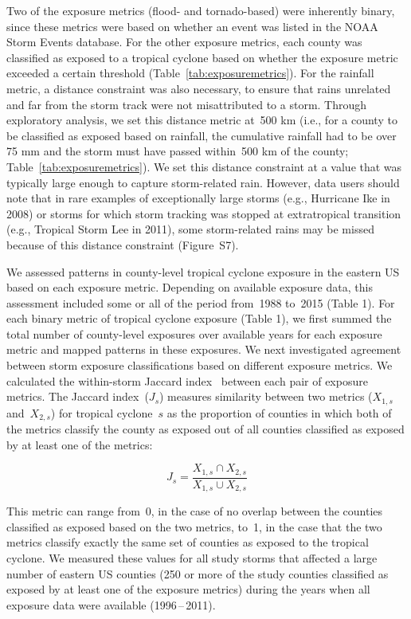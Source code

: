 Two of the exposure metrics (flood- and tornado-based) were inherently binary,
since these metrics were based on whether an event was listed in the NOAA Storm
Events database.  For the other exposure metrics, each county was classified as
exposed to a tropical cyclone based on whether the exposure metric exceeded a
certain threshold (Table~\ref{tab:exposuremetrics}). For the rainfall metric, a
distance constraint was also necessary, to ensure that rains unrelated and far
from the storm track were not misattributed to a storm. Through exploratory
analysis, we set this distance metric at~500 \si{\kilo\metre} (i.e., for a
county to be classified as exposed based on rainfall, the cumulative rainfall
had to be over 75 \si{\milli\metre} and the storm must have passed within~500
\si{\kilo\metre} of the county; Table~\ref{tab:exposuremetrics}). We set this
distance constraint at a value that was typically large enough to capture
storm-related rain. However, data users should note that in rare examples of
exceptionally large storms (e.g., Hurricane Ike in 2008) or storms for which
storm tracking was stopped at extratropical transition (e.g., Tropical Storm
Lee in 2011), some storm-related rains may be missed because of this distance
constraint (Figure~S7). 

We assessed patterns in county-level tropical cyclone exposure in the eastern
\ac{US} based on each exposure metric. Depending on available exposure data,
this assessment included some or all of the period from~1988 to~2015 (Table 1).
For each binary metric of tropical cyclone exposure (Table 1), we first summed
the total number of county-level exposures over available years for each
exposure metric and mapped patterns in these exposures. We next investigated
agreement between storm exposure classifications based on different exposure
metrics. We calculated the within-storm Jaccard
index~\parencite{jaccard1901distribution, jaccard1908nouvelles} between each
pair of exposure metrics. The Jaccard index~($J_s$) measures similarity between
two metrics ($X_{1,s}$ and~$X_{2,s}$) for tropical cyclone~$s$ as the
proportion of counties in which both of the metrics classify the county as
exposed out of all counties classified as exposed by at least one of the
metrics:

\begin{equation} 
J_s = \frac{X_{1,s} \cap X_{2,s}}{X_{1,s} \cup X_{2,s}}
\end{equation}

\noindent This metric can range from~0, in the case of no overlap between the
counties classified as exposed based on the two metrics, to~1, in the case that
the two metrics classify exactly the same set of counties as exposed to the
tropical cyclone. We measured these values for all study storms that affected a
large number of eastern \ac{US} counties (250 or more of the study counties
classified as exposed by at least one of the exposure metrics) during the years
when all exposure data were available (1996\,--\,2011).

